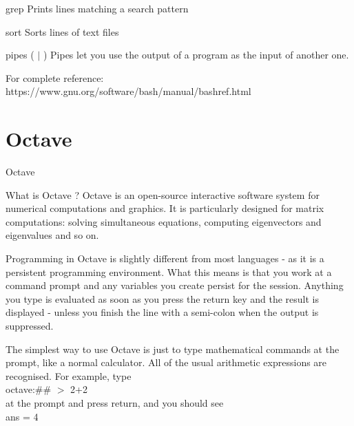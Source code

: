 \documentclass[pdf]{beamer}
\begin{document}
\begin{frame}

\begin{block}{grep}
Prints lines matching a search pattern
\end{block}

\begin{block}{sort}
Sorts lines of text files
\end{block}

\begin{block}{pipes ( $\mid$ )}
Pipes let you use the output of a program as the input of another one.
\end{block}

\begin{block}{}
For complete reference: \\
https://www.gnu.org/software/bash/manual/bashref.html
\end{block}

\end{frame}

\section{Octave}

\begin{frame}{Octave}
\begin{block}{What is Octave ?}
Octave is an open-source interactive software system for numerical computations and
graphics. It is particularly designed for matrix computations: solving simultaneous equations, computing eigenvectors and eigenvalues and so on.
\end{block}
\end{frame}

\begin{frame}
\begin{block}{}
Programming in Octave is slightly different from most languages - as it is a persistent
programming environment. What this means is that you work at a command prompt and any
variables you create persist for the session. Anything you type is evaluated as soon as you press the return key and the result is displayed - unless you finish the line with a semi-colon when the output is suppressed.
\end{block}
\end{frame}

\begin{frame}
\begin{example}
The simplest way to use Octave is just to type mathematical commands at the prompt,
like a normal calculator.  All of the usual arithmetic expressions are recognised.  For
example, type \\
octave:\#\# $>$ 2+2 \\
at the prompt and press return, and you should see \\
ans = 4
\end{example}
\end{frame}
\end{document}
